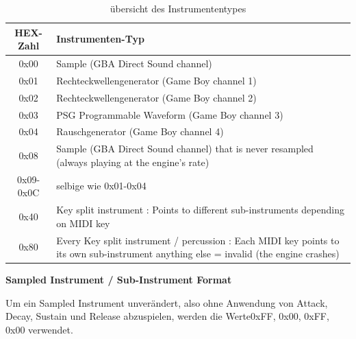 \documentclass[11pt,a4paper]{scrartcl}
\newcommand{\paratitle}[1] {
    \vspace{5mm}
    \large \textbf{#1} \normalsize
    \vspace{2mm}\newline
}
\begin{document}
\begin{table}[h]
    \centering
    \begin{tabular}{ c | p{15cm} }
        \textbf{HEX-Zahl} & \textbf{Instrumenten-Typ} \\
        \hline
        0x00 & Sample (GBA Direct Sound channel) \\
        \hline
        0x01 & Rechteckwellengenerator (Game Boy channel 1) \\
        \hline
        0x02 & Rechteckwellengenerator (Game Boy channel 2) \\
        \hline
        0x03 & PSG Programmable Waveform (Game Boy channel 3) \\
        \hline
        0x04 & Rauschgenerator (Game Boy channel 4) \\
        \hline
        0x08 & Sample (GBA Direct Sound channel) that is never resampled (always playing at the engine's rate) \\
				\hline
        0x09-0x0C & selbige wie 0x01-0x04\\
				\hline
        0x40 & Key split instrument  : Points to different sub-instruments depending on MIDI key \\
				\hline
        0x80 & Every Key split instrument / percussion : Each MIDI key points to its own sub-instrument anything else = invalid (the engine crashes) \\
    \end{tabular}
    \caption{\"ubersicht des Instrumententypes}
    \label{table:InstrumentenTyp}
\end{table}

\paratitle{Sampled Instrument / Sub-Instrument Format}
Um ein Sampled Instrument unver\"andert, also ohne Anwendung von Attack, Decay, Sustain und Release abzuspielen, werden die Werte0xFF, 0x00, 0xFF, 0x00 verwendet.
\end{document}
